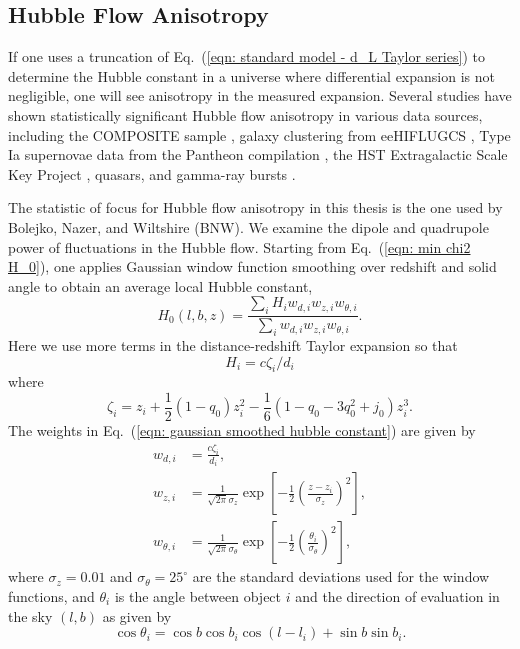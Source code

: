 \documentclass[a4paper,12pt]{report}
\newcommand{\degree}{^\circ}
\renewcommand{\eqref}[1]{Eq.~({#1})}
\begin{document}
\subsection{Hubble Flow Anisotropy}\label{section: introduction - hubble flow anisotropy}
If one uses a truncation of \eqref{\ref{eqn: standard model - d_L Taylor series}} to determine the Hubble constant in a universe where differential expansion is not negligible, one will see anisotropy in the measured expansion. Several studies have shown statistically significant Hubble flow anisotropy in various data sources, including the COMPOSITE sample \cite{RN3}, galaxy clustering from eeHIFLUGCS \cite{RN121,RN106}, Type Ia supernovae data from the Pantheon compilation \cite{RN108}, the HST Extragalactic Scale Key Project \cite{RN119}, quasars, and gamma-ray bursts \cite{RN107}.

The statistic of focus for Hubble flow anisotropy in this thesis is the one used by Bolejko, Nazer, and Wiltshire \cite{RN3} (BNW). We examine the dipole and quadrupole power of fluctuations in the Hubble flow. Starting from \eqref{\ref{eqn: min chi2 H_0}}, one applies Gaussian window function smoothing over redshift and solid angle to obtain an average local Hubble constant,
\begin{equation}\label{eqn: gaussian smoothed hubble constant}
  H_0 (l, b, z) = \frac{\sum_i H_i w_{d,i} w_{z,i} w_{\theta,i}}{\sum_i w_{d,i} w_{z,i} w_{\theta,i}}.
\end{equation}
Here we use more terms in the distance-redshift Taylor expansion so that
\begin{equation}
  H_i = c \zeta_i / d_i
\end{equation}
where
\begin{equation}
  \zeta_i = z_i + \frac{1}{2}(1-q_0)z_i^2 - \frac{1}{6}(1-q_0-3q_0^2+j_0)z_i^3.
\end{equation}
The weights in \eqref{\ref{eqn: gaussian smoothed hubble constant}} are given by
\begin{align}
  w_{d,i} &= \frac{c\zeta_i}{d_i}, \\
  w_{z,i} &= \frac{1}{\sqrt{2\pi}\sigma_z}\exp\left[-\frac{1}{2}\left(\frac{z-z_i}{\sigma_z}\right)^2\right], \\
  w_{\theta,i} &= \frac{1}{\sqrt{2\pi}\sigma_\theta}\exp\left[-\frac{1}{2}\left(\frac{\theta_i}{\sigma_\theta}\right)^2\right],
\end{align}
where $\sigma_z = 0.01$ and $\sigma_\theta = 25\degree$ are the standard deviations used for the window functions, and $\theta_i$ is the angle between object $i$ and the direction of evaluation in the sky $(l,b)$ as given by
\begin{equation}
  \cos\theta_i = \cos b \cos b_i \cos(l-l_i) + \sin b \sin b_i.
\end{equation}
\end{document}
